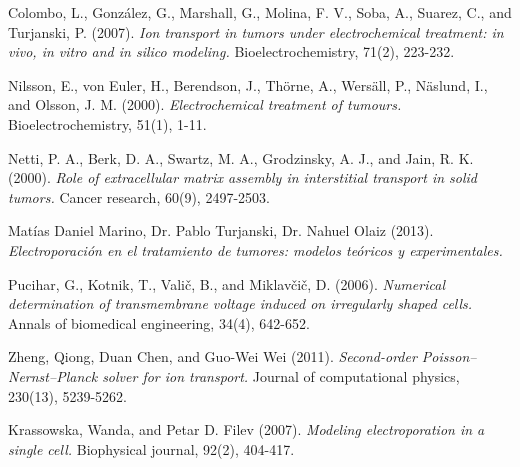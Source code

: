 \backmatter


\begin{thebibliography}{99}
	Colombo, L., González, G., Marshall, G., Molina, F. V., Soba, A., Suarez, C., and Turjanski, P. (2007). \emph{Ion transport in tumors under electrochemical treatment: in vivo, in vitro and in silico modeling.} Bioelectrochemistry, 71(2), 223-232.

	Nilsson, E., von Euler, H., Berendson, J., Thörne, A., Wersäll, P., Näslund, I., and Olsson, J. M. (2000). \emph{Electrochemical treatment of tumours.} Bioelectrochemistry, 51(1), 1-11.

	Netti, P. A., Berk, D. A., Swartz, M. A., Grodzinsky, A. J., and Jain, R. K. (2000). \emph{Role of extracellular matrix assembly in interstitial transport in solid tumors.} Cancer research, 60(9), 2497-2503.

	Matías Daniel Marino, Dr. Pablo Turjanski, Dr. Nahuel Olaiz (2013). \emph{Electroporación en el tratamiento de tumores: modelos teóricos y experimentales.}

	Pucihar, G., Kotnik, T., Valič, B., and Miklavčič, D. (2006). \emph{Numerical determination of transmembrane voltage induced on irregularly shaped cells.} Annals of biomedical engineering, 34(4), 642-652.

	Zheng, Qiong, Duan Chen, and Guo-Wei Wei (2011). \emph{Second-order Poisson–Nernst–Planck solver for ion transport.} Journal of computational physics, 230(13), 5239-5262.

	Krassowska, Wanda, and Petar D. Filev (2007). \emph{Modeling electroporation in a single cell.} Biophysical journal, 92(2), 404-417.


\end{thebibliography}
